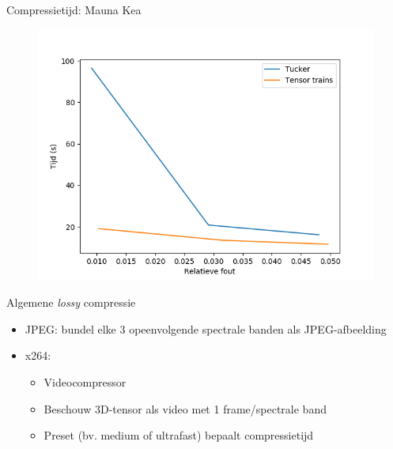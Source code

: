 \documentclass[t,12pt,dutch
\ifx\beamermode\undefined\else,\beamermode\fi
]{beamer}
\begin{document}
\begin{frame}{Compressietijd: Mauna Kea}

\begin{figure}[H]
\centering
\includegraphics[scale=0.5]{images/tucker_vs_tensor_trains_times_Mauna_Kea.png}
\end{figure}

\end{frame}

\iffalse

\begin{frame}{Algemene \textit{lossy} compressie}

\begin{itemize}
\item JPEG: bundel elke 3 opeenvolgende spectrale banden als JPEG-afbeelding
\item x264:
\begin{itemize}
\item Videocompressor
\item Beschouw 3D-tensor als video met 1 frame/spectrale band
\item Preset (bv. medium of ultrafast) bepaalt compressietijd
\end{itemize}
\end{itemize}

\end{frame}
\end{document}
